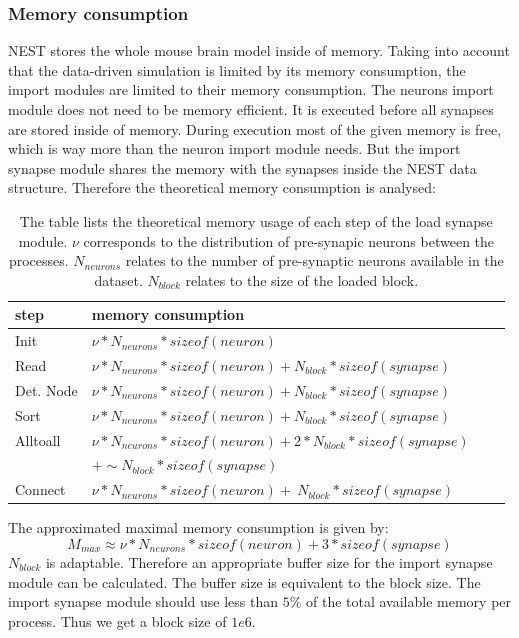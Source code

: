 \subsubsection{Memory consumption}
NEST stores the whole mouse brain model inside of memory.
Taking into account that the data-driven simulation is limited by its memory consumption, the import modules are limited to their memory consumption.
The neurons import module does not need to be memory efficient.
It is executed before all synapses are stored inside of memory.
During execution most of the given memory is free, which is way more than the neuron import module needs.
But the import synapse module shares the memory with the synapses inside the NEST data structure. 
Therefore the theoretical memory consumption is analysed:
\begin{table}[ht!]
\begin{tabular}{| l | l | l | l |}
    \hline
    step & memory consumption \\ \hline \hline
    Init & $\nu * N_{neurons} * sizeof(neuron)$ \\ \hline
    Read & $\nu * N_{neurons} * sizeof(neuron) + N_{block} * sizeof(synapse)$ \\ \hline
    Det. Node & $\nu * N_{neurons} * sizeof(neuron) + N_{block} * sizeof(synapse)$ \\ \hline
    Sort & $\nu * N_{neurons} * sizeof(neuron) + N_{block} * sizeof(synapse)$ \\ \hline
    Alltoall & $\nu * N_{neurons} * sizeof(neuron) + 2 * N_{block} * sizeof(synapse)$ \\
    &$ + \sim N_{block} * sizeof(synapse)$ \\ \hline
    Connect & $\nu * N_{neurons} * sizeof(neuron) +  ~N_{block} * sizeof(synapse) $ \\ \hline 
    \end{tabular}
\caption{The table lists the theoretical memory usage of each step of the load synapse module.
$\nu$ corresponds to the distribution of pre-synapic neurons between the processes.
$N_{neurons}$ relates to the number of pre-synaptic neurons available in the dataset.
$N_{block}$ relates to the size of the loaded block.}
\end{table}
The approximated maximal memory consumption is given by:
\begin{equation}
 M_{max} \approx \nu * N_{neurons} * sizeof(neuron) + 3 * sizeof(synapse)
\end{equation}
$N_{block}$ is adaptable.
Therefore an appropriate buffer size for the import synapse module can be calculated.
The buffer size is equivalent to the block size.
The import synapse module should use less than $5\%$ of the total available memory per process.
Thus we get a block size of $1e6$.